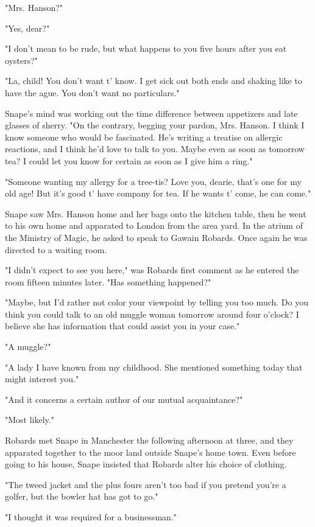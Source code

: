 "Mrs. Hanson?"

"Yes, dear?"

"I don't mean to be rude, but what happens to you five hours after you eat oysters?"

"La, child! You don't want t' know. I get sick out both ends and shaking like to have the ague. You don't want no particulars."

Snape's mind was working out the time difference between appetizers and late glasses of sherry. "On the contrary, begging your pardon, Mrs. Hanson. I think I know someone who would be fascinated. He's writing a treatise on allergic reactions, and I think he'd love to talk to you. Maybe even as soon as tomorrow tea? I could let you know for certain as soon as I give him a ring."

"Someone wanting my allergy for a tree-tis? Love you, dearie, that's one for my old age! But it's good t' have company for tea. If he wants t' come, he can come."

Snape saw Mrs. Hanson home and her bags onto the kitchen table, then he went to his own home and apparated to London from the area yard. In the atrium of the Ministry of Magic, he asked to speak to Gawain Robards. Once again he was directed to a waiting room.

"I didn't expect to see you here," was Robards first comment as he entered the room fifteen minutes later. "Has something happened?"

"Maybe, but I'd rather not color your viewpoint by telling you too much. Do you think you could talk to an old muggle woman tomorrow around four o'clock? I believe she has information that could assist you in your case."

"A muggle?"

"A lady I have known from my childhood. She mentioned something today that might interest you."

"And it concerns a certain author of our mutual acquaintance?"

"Most likely."

Robards met Snape in Manchester the following afternoon at three, and they apparated together to the moor land outside Snape's home town. Even before going to his house, Snape insisted that Robards alter his choice of clothing.

"The tweed jacket and the plus fours aren't too bad if you pretend you're a golfer, but the bowler hat has got to go."

"I thought it was required for a businessman."

